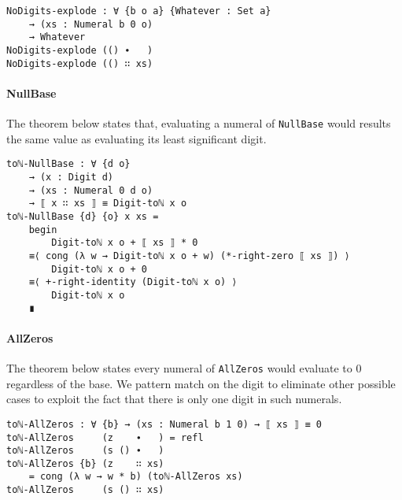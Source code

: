 \documentclass[\main/thesis.tex]{subfiles}
\begin{document}
\begin{lstlisting}
NoDigits-explode : ∀ {b o a} {Whatever : Set a}
    → (xs : Numeral b 0 o)
    → Whatever
NoDigits-explode (() ∙   )
NoDigits-explode (() ∷ xs)
\end{lstlisting}

\paragraph{NullBase}

The theorem below states that, evaluating a numeral of {\lstinline|NullBase|}
would results the same value as evaluating its least significant digit.

\begin{lstlisting}
toℕ-NullBase : ∀ {d o}
    → (x : Digit d)
    → (xs : Numeral 0 d o)
    → ⟦ x ∷ xs ⟧ ≡ Digit-toℕ x o
toℕ-NullBase {d} {o} x xs =
    begin
        Digit-toℕ x o + ⟦ xs ⟧ * 0
    ≡⟨ cong (λ w → Digit-toℕ x o + w) (*-right-zero ⟦ xs ⟧) ⟩
        Digit-toℕ x o + 0
    ≡⟨ +-right-identity (Digit-toℕ x o) ⟩
        Digit-toℕ x o
    ∎
\end{lstlisting}

\paragraph{AllZeros}

The theorem below states every numeral of {\lstinline|AllZeros|}
would evaluate to $ 0 $ regardless of the base.
We pattern match on the digit to eliminate other possible cases to exploit the
fact that there is only one digit in such numerals.

\begin{lstlisting}
toℕ-AllZeros : ∀ {b} → (xs : Numeral b 1 0) → ⟦ xs ⟧ ≡ 0
toℕ-AllZeros     (z    ∙   ) = refl
toℕ-AllZeros     (s () ∙   )
toℕ-AllZeros {b} (z    ∷ xs)
    = cong (λ w → w * b) (toℕ-AllZeros xs)
toℕ-AllZeros     (s () ∷ xs)
\end{lstlisting}
\end{document}
